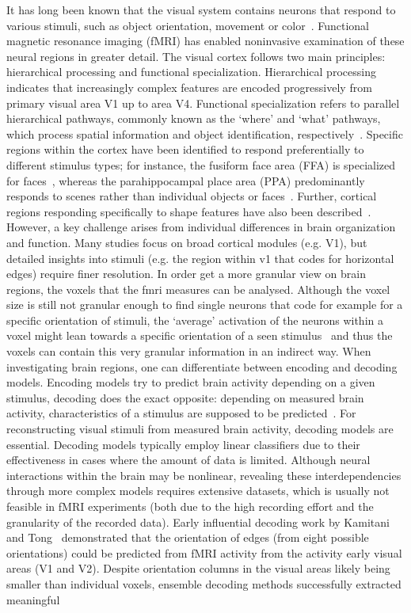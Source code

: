 It has long been known that the visual system contains neurons that respond to various stimuli, such as object orientation, movement or color~\cite{grill-spectorHUMANVISUALCORTEX2004}. Functional magnetic resonance imaging (fMRI) has enabled noninvasive examination of these neural regions in greater detail. The visual cortex follows two main principles: hierarchical processing and functional specialization. Hierarchical processing indicates that increasingly complex features are encoded progressively from primary visual area V1 up to area V4. Functional specialization refers to parallel hierarchical pathways, commonly known as the `where' and `what' pathways, which process spatial information and object identification, respectively~\cite{grill-spectorHUMANVISUALCORTEX2004}. Specific regions within the cortex have been identified to respond preferentially to different stimulus types; for instance, the fusiform face area (FFA) is specialized for faces~\cite{kanwisherFusiformFaceArea1997}, whereas the parahippocampal place area (PPA) predominantly responds to scenes rather than individual objects or faces~\cite{epsteinCorticalRepresentationLocal1998}. Further, cortical regions responding specifically to shape features have also been described~\cite{kourtziCorticalRegionsInvolved2000}. However, a key challenge arises from individual differences in brain organization and function. Many studies focus on broad cortical modules (e.g. V1), but detailed insights into stimuli (e.g. the region within v1 that codes for horizontal edges) require finer resolution. In order get a more granular view on brain regions, the voxels that the fmri measures can be analysed. Although the voxel size is still not granular enough to find single neurons that code for example for a specific orientation of stimuli, the `average' activation of the neurons within a voxel might lean towards a specific orientation of a seen stimulus~\cite{kamitaniDecodingVisualSubjective2005} and thus the voxels can contain this very granular information in an indirect way. When investigating brain regions, one can differentiate between encoding and decoding models. Encoding models try to predict brain activity depending on a given stimulus, decoding does the exact opposite: depending on measured brain activity, characteristics of a stimulus are supposed to be predicted~\cite{naselarisEncodingDecodingFMRI2011}. For reconstructing visual stimuli from measured brain activity, decoding models are essential. Decoding models typically employ linear classifiers due to their effectiveness in cases where the amount of data is limited. Although neural interactions within the brain may be nonlinear, revealing these interdependencies through more complex models requires extensive datasets, which is usually not feasible in fMRI experiments (both due to the high recording effort and the granularity of the recorded data). Early influential decoding work by Kamitani and Tong~\cite{kamitaniDecodingVisualSubjective2005} demonstrated that the orientation of edges (from eight possible orientations) could be predicted from fMRI activity from the activity early visual areas (V1 and V2). Despite orientation columns in the visual areas likely being smaller than individual voxels, ensemble decoding methods successfully extracted meaningful 